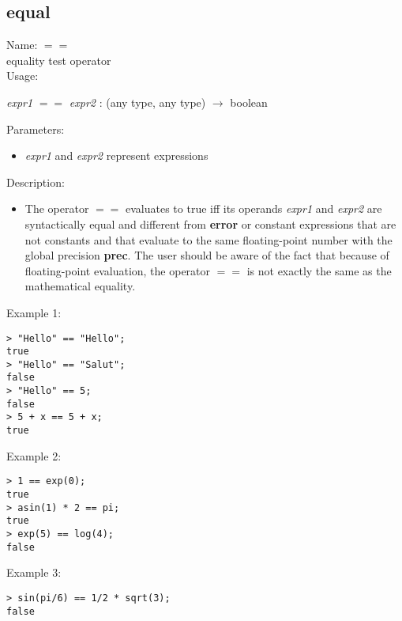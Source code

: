 \subsection{equal}
\label{labequal}
\noindent Name: \textbf{$==$}\\
equality test operator\\

\noindent Usage: 
\begin{center}
\emph{expr1} \textbf{$==$} \emph{expr2} : (\textsf{any type}, \textsf{any type}) $\rightarrow$ \textsf{boolean}\\
\end{center}
Parameters: 
\begin{itemize}
\item \emph{expr1} and \emph{expr2} represent expressions
\end{itemize}
\noindent Description: \begin{itemize}

\item The operator \textbf{$==$} evaluates to true iff its operands \emph{expr1} and
   \emph{expr2} are syntactically equal and different from \textbf{error} or constant
   expressions that are not constants and that evaluate to the same
   floating-point number with the global precision \textbf{prec}. The user should
   be aware of the fact that because of floating-point evaluation, the
   operator \textbf{$==$} is not exactly the same as the mathematical
   equality.
\end{itemize}
\noindent Example 1: 
\begin{center}\begin{minipage}{15cm}\begin{Verbatim}[frame=single]
> "Hello" == "Hello";
true
> "Hello" == "Salut";
false
> "Hello" == 5;
false
> 5 + x == 5 + x;
true
\end{Verbatim}
\end{minipage}\end{center}
\noindent Example 2: 
\begin{center}\begin{minipage}{15cm}\begin{Verbatim}[frame=single]
> 1 == exp(0);
true
> asin(1) * 2 == pi;
true
> exp(5) == log(4);
false
\end{Verbatim}
\end{minipage}\end{center}
\noindent Example 3: 
\begin{center}\begin{minipage}{15cm}\begin{Verbatim}[frame=single]
> sin(pi/6) == 1/2 * sqrt(3);
false
\end{Verbatim}
\end{minipage}\end{center}
